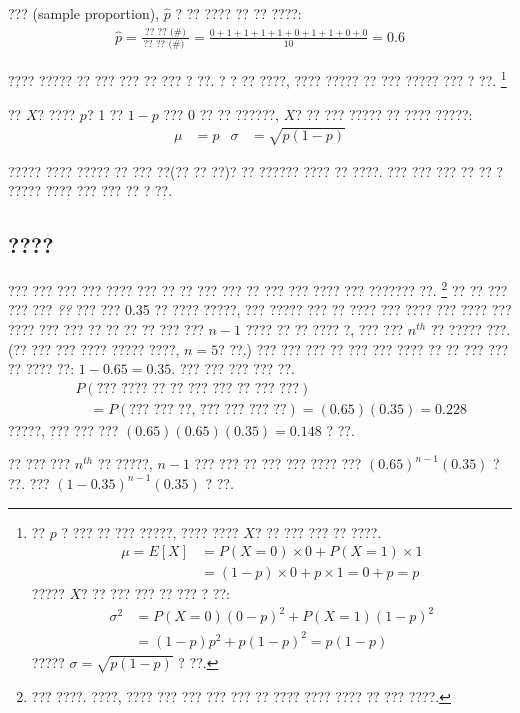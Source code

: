 \begin{center}
         
\end{center}
??? (sample proportion), $\hat{p}$ ? ?? ???? ?? ?? ????:
\begin{eqnarray*}
\hat{p} = \frac{\text{ ?? ?? (\#) }}{\text{?? ?? (\#) }} = \frac{0+1+1+1+1+0+1+1+0+0}{10} = 0.6
\end{eqnarray*}%

???? ????? ?? ??? ??? ?? ??? ? ??.  ?  ? ?? ????, ???? ????? ?? ??? ????? ??? ? ??.
\footnote{?? ${p}$ ? ??? ?? ??? ?????, ???? ???? $X$? ?? ??? ??? ?? ????.
\begin{align*}
\mu = E[X] &= P(X=0)\times0 + P(X=1)\times1 \\
	&= (1-p)\times0 + p\times 1 = 0+p = p
\end{align*}
????? $X$? ?? ??? ??? ?? ??? ? ??:
\begin{align*}
\sigma^2 &= {P(X=0)(0-p)^2 + P(X=1)(1-p)^2} \\
	&= {(1-p)p^2 + p(1-p)^2} = {p(1-p)}
\end{align*}
????? $\sigma=\sqrt{p(1-p)}$ ? ??.}

\begin{termBox}{
?? $X$? ???? $p$? 1 ?? $1-p$ ??? 0 ?? ?? ??????, $X$? ?? ??? ????? ?? ???? ?????:
\begin{align*}
\mu &= p
	&\sigma&= \sqrt{p(1-p)}
\end{align*}}
\end{termBox}

????? ???? ????? ?? ??? ??(?? ?? ??)? ?? ?????? ???? ?? ????. ??? ??? ??? ?? ??  ?  ????? ???? ??? ??? ?? ? ??.


\subsection{????}


\begin{example}{??? ??? ??? ??? ???? ??? ?? ?? ??? ??? ?? ??? ??? ???? ??? ??????? ??. \footnote{??? ????. ????, ???? ??? ??? ??? ??? ?? ???? ???? ???? ?? ??? ????.}
?? ?? ??? ??? ??? \emph{??} ??? ??? 0.35 ?? ???? ?????, ??? ????? ??? ?? ???? ??? ???? ??? ???? ??? ???? ??? ??? ?? ?? ?? ?? ??? ??? $n-1$ ???? ?? ?? ???? ?, ??? ??? $n^{th}$ ?? ????? ???. (?? ??? ??? ???? ????? ????, $n=5$? ??.)} \label{waitForShocker}
??? ??? ??? ?? ??? ??? ???? ?? ?? ??? ??? ?? ???? ??: $1-0.65=0.35$. ??? ??? ??? ??? ??.
\begin{eqnarray*}
&&P(\text{??? ???? ?? ?? ??? ??? ?? ??? ???}) \\
&&\quad = P(\text{??? ??? ??, ??? ??? ??? ??}) = (0.65)(0.35) = 0.228
\end{eqnarray*}
?????, ??? ??? ??? $(0.65)(0.65)(0.35) = 0.148$ ? ??.

?? ??? ??? $n^{th}$ ?? ?????, $n-1$ ??? ??? ?? ??? ??? ???? ??? $(0.65)^{n-1}(0.35)$ ? ??. ??? $(1-0.35)^{n-1}(0.35)$ ? ??.
\end{example}


